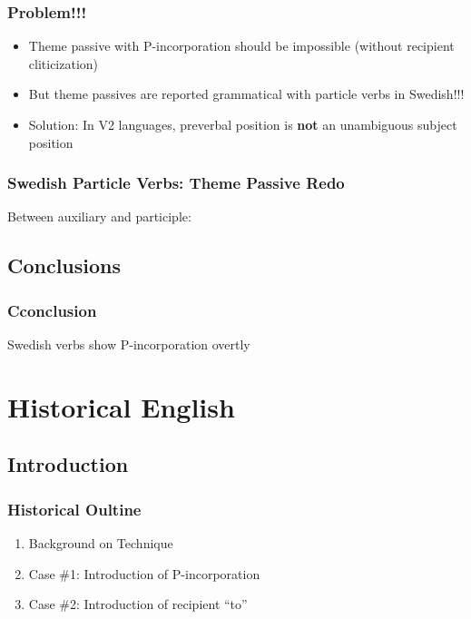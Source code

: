 \documentclass{beamer}
\begin{document}
\begin{frame}
	\frametitle{Problem!!!}
	\begin{itemize}
		\item Theme passive with P-incorporation should be impossible (without recipient cliticization)
		\item But theme passives are reported grammatical with particle verbs in Swedish!!!
		\pause
		\item Solution: In V2 languages, preverbal position is \textbf{not} an unambiguous subject position
	\end{itemize}
\end{frame}

\begin{frame}
	\frametitle{Swedish Particle Verbs: Theme Passive Redo}
	\begin{exe}
	\ex Between auxiliary and participle:
		\begin{xlist}
		\end{xlist}
\end{exe}
\end{frame}
\subsection{Conclusions}
\begin{frame}
	\frametitle{Cconclusion}
	\vfill
	\Large
	Swedish verbs show P-incorporation overtly
	\vfill
\end{frame}

\section{Historical English}
\subsection{Introduction}
\begin{frame}
	\frametitle{Historical Oultine}
	\begin{enumerate}
		\item Background on Technique
		\item Case \#1: Introduction of P-incorporation
		\item Case \#2: Introduction of recipient ``to''
	\end{enumerate}
\end{frame}
\end{document}
